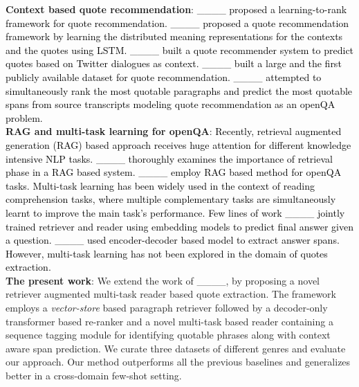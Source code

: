 \noindent\textbf{Context based quote recommendation}:
\textcolor{black}{____ proposed a learning-to-rank framework for quote recommendation. %
____ proposed a quote recommendation framework by learning the distributed meaning representations for the contexts and the quotes using LSTM. ____ built a quote recommender system to predict quotes based on Twitter dialogues as context. 
____ built a large and the first publicly available dataset for quote recommendation. ____ attempted to simultaneously rank the most quotable paragraphs and predict the most quotable spans from source transcripts modeling quote recommendation as an openQA problem.}\\ 
\noindent\textbf{RAG and multi-task learning for openQA}: \textcolor{black}{Recently, retrieval augmented generation (RAG) based approach receives huge attention for different knowledge intensive NLP tasks. ____ thoroughly examines the importance of retrieval phase in a RAG based system. ____ employ RAG based method for openQA tasks.  Multi-task learning has been widely used in the context of reading comprehension tasks, where multiple complementary tasks are simultaneously learnt to improve the main task's performance. Few lines of work ____ jointly trained retriever and reader using embedding models to predict final answer given a question. ____ used encoder-decoder based model to extract answer spans. However, multi-task learning has not been explored in the domain of quotes extraction.}\\ 
\fi
\noindent\textbf{The present work}: We extend the work of ____, by proposing a novel retriever augmented multi-task reader based quote extraction. The framework employs a \textit{vector-store} based paragraph retriever followed by a decoder-only transformer based re-ranker and a novel multi-task based reader containing a sequence tagging module for identifying quotable phrases along with context aware span prediction. We curate three datasets of different genres and evaluate our approach. Our method outperforms all the previous baselines and generalizes better in a cross-domain few-shot setting.
